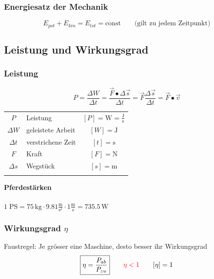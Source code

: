 	
	
	\subsubsection{Energiesatz der Mechanik} 
	$$ \boxed{ E_{pot} + E_{kin} = E_{tot} = \text{const} } \qquad \text{(gilt zu jedem Zeitpunkt)} $$
	
	
	
	\subsection{Leistung und Wirkungsgrad}
	
	\subsubsection{Leistung}
	
	$$ \boxed{ P = \frac{\Delta W}{\Delta t} = \frac{\vec{F} \bullet \Delta \vec{s}}{\Delta t} = \vec{F} \frac{\Delta \vec{s}}{\Delta t} = \vec{F} \bullet \vec{v} } $$ 
	
	
	\begin{tabular}{c l c}
	$P$ & Leistung & $[P] = \mathrm{W = \frac{J}{s}}$ \\
	$\Delta W$ & geleistete Arbeit & $[W] = \mathrm{J}$ \\
	$\Delta t$ & verstrichene Zeit & $[t] = \mathrm{s}$ \\
	$F$ & Kraft & $[F] = \mathrm{N}$ \\
	$\Delta s$ & Wegstück & $[s] = \mathrm{m}$ \\
	\\
	\end{tabular}
	
	\textbf{Pferdestärken} \\
	\\
	$1 \; \mathrm{PS} = 75 \, \mathrm{kg} \cdot 9.81 \mathrm{\frac{m}{s^2}} \cdot 1 \mathrm{\frac{m}{s}} = 735.5 \, \mathrm{W}$ \\
	
	
	\vfill\null
	\columnbreak
	
	
	\subsubsection{Wirkungsgrad $\eta$}	
	Faustregel: Je grösser eine Maschine, desto besser ihr Wirkungsgrad \\
	
	$$ \boxed{ \eta = \frac{P_{ab}}{P_{zu}} } \qquad \textcolor{red}{\eta < 1} \qquad [\eta] = 1 $$
	

